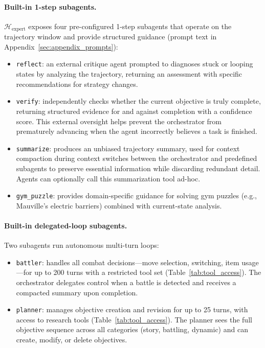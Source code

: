 \paragraph{Built-in 1-step subagents.} $\mathcal{H}_{\text{expert}}$ exposes four pre-configured 1-step subagents that operate on the trajectory window and provide structured guidance (prompt text in Appendix~\ref{sec:appendix_prompts}):
\begin{itemize}[nosep]
    \item \texttt{reflect}: an external critique agent prompted to diagnoses stuck or looping states by analyzing the trajectory, returning an assessment with specific recommendations for strategy changes.
    \item \texttt{verify}: independently checks whether the current objective is truly complete, returning structured evidence for and against completion with a confidence score. This external oversight helps prevent the orchestrator from prematurely advancing when the agent incorrectly believes a task is finished.
    \item \texttt{summarize}: produces an unbiased trajectory summary, used for context compaction during context switches between the orchestrator and predefined subagents to preserve essential information while discarding redundant detail. Agents can optionally call this summarization tool ad-hoc.
    \item \texttt{gym\_puzzle}: provides domain-specific guidance for solving gym puzzles (e.g., Mauville's electric barriers) combined with current-state analysis.
\end{itemize}

\paragraph{Built-in delegated-loop subagents.} Two subagents run autonomous multi-turn loops:
\begin{itemize}[nosep]
    \item \texttt{battler}: handles all combat decisions---move selection, switching, item usage---for up to 200 turns with a restricted tool set (Table~\ref{tab:tool_access}). The orchestrator delegates control when a battle is detected and receives a compacted summary upon completion.
    \item \texttt{planner}: manages objective creation and revision for up to 25 turns, with access to research tools (Table~\ref{tab:tool_access}). The planner sees the full objective sequence across all categories (story, battling, dynamic) and can create, modify, or delete objectives.
\end{itemize}

